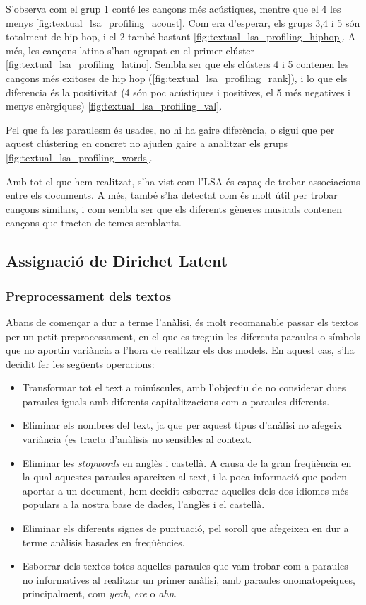 S'observa com el grup 1 conté les cançons més acústiques, mentre que el 4 les menys \ref{fig:textual_lsa_profiling_acoust}. Com era d'esperar, els grups 3,4 i 5 són totalment de hip hop, i el 2 també bastant \ref{fig:textual_lsa_profiling_hiphop}. A més, les cançons latino s'han agrupat en el primer clúster \ref{fig:textual_lsa_profiling_latino}. Sembla ser que els clústers 4 i 5 contenen les cançons més exitoses de hip hop (\ref{fig:textual_lsa_profiling_rank}), i lo que els diferencia és la positivitat (4 són poc acústiques i positives, el 5 més negatives i menys enèrgiques) \ref{fig:textual_lsa_profiling_val}.

Pel que fa les paraulesm és usades, no hi ha gaire diferència, o sigui que per aquest clústering en concret no ajuden gaire a analitzar els grups \ref{fig:textual_lsa_profiling_words}.

Amb tot el que hem realitzat, s'ha vist com l'LSA és capaç de trobar associacions entre els documents. A més, també s'ha detectat com és molt útil per trobar cançons similars, i com sembla ser que els diferents gèneres musicals contenen cançons que tracten de temes semblants.

\newpage
\subsection{Assignació de Dirichet Latent}

\subsubsection{Preprocessament dels textos}

Abans de començar a dur a terme l'anàlisi, és molt recomanable passar els textos per un petit preprocessament, en el que es treguin les diferents paraules o símbols que no aportin variància a l'hora de realitzar els dos models. En aquest cas, s'ha decidit fer les següents operacions:

\begin{itemize}
    \item Transformar tot el text a minúscules, amb l'objectiu de no considerar dues paraules iguals amb diferents capitalitzacions com a paraules diferents.
    \item Eliminar els nombres del text, ja que per aquest tipus d'anàlisi no afegeix variància (es tracta d'anàlisis no sensibles al context.
    \item Eliminar les \textit{stopwords} en anglès i castellà. A causa de la gran freqüència en la qual aquestes paraules apareixen al text, i la poca informació que poden aportar a un document, hem decidit esborrar aquelles dels dos idiomes més populars a la nostra base de dades, l'anglès i el castellà.
    \item Eliminar els diferents signes de puntuació, pel soroll que afegeixen en dur a terme anàlisis basades en freqüències.
    \item Esborrar dels textos totes aquelles paraules que vam trobar com a paraules no informatives al realitzar un primer anàlisi, amb paraules onomatopeiques, principalment, com \textit{yeah}, \textit{ere} o \textit{ahn}. 
\end{itemize}

